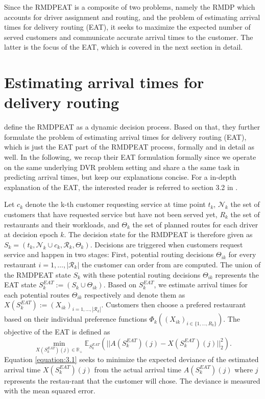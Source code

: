 Since the RMDPEAT is a composite of two problems, namely the RMDP which accounts for driver assignment and routing, and the problem of estimating arrival times for delivery routing (EAT), it seeks to maximize the expected number of served customers and communicate accurate arrival times to the customer. The latter is the focus of the EAT, which is covered in the next section in detail.

\section{Estimating arrival times for delivery routing}

\cite{Hildebrandt2020_EAT} define the RMDPEAT as a dynamic decision process. Based on that, they further formulate the problem of estimating arrival times for delivery routing (EAT), which is just the EAT part of the RMDPEAT process, formally and in detail as well. In the following, we recap their EAT formulation formally since we operate on the same underlying DVR problem setting and share a the same task in predicting arrival times, but keep our explanations concise. For a in-depth explanation of the EAT, the interested reader is referred to section 3.2 in \cite{Hildebrandt2020_EAT}. 

Let $ c_k $ denote the k-th customer requesting service at time point $ t_k $, $ \mathcal{N}_k $ the set of customers that have requested service but have not been served yet, $ R_k $ the set of restaurants and their workloads, and $ \Theta_k $ the set of planned routes for each driver at decision epoch $ k $. The decision state for the RMDPEAT is therefore given as $ S_k = (t_k, \mathcal{N}_k \cup c_k, \mathcal{R}_k, \Theta_k) $. Decisions are triggered when customers request service and happen in two stages: First, potential routing decisions $ \Theta_{ik} $ for every restaurant $ i = 1, \dots, |\mathcal{R}_k| $ the customer can order from are computed. The union of the RMDPEAT state $ S_k $ with these potential routing decisions $ \Theta_{ik} $ represents the EAT state $ S^{EAT}_k := (S_k \cup \Theta_{ik})$. Based on $ S^{EAT}_k $, we estimate arrival times for each potential routes $ \Theta_{ik} $ respectively and denote them as $ X(S^{EAT}_k) := (X_{ik})_{i = 1, \dots, |\mathcal{R}_k|}$. Customers then choose a prefered restaurant based on their individual preference functions $ \Phi_k((X_{ik})_{i \in \{1,\dots, R_k\}}) $.  
The objective of the EAT is defined as
\begin{equation}\label{equation:3.1}
	\min_{X(S^{EAT}_k)(j) \in \mathbb{R}_+} 
	\mathbb{E}_{S^{EAT}_{k}} 
	(|| A(S^{EAT}_{k})(j) - X(S^{EAT}_{k})(j)||^{2}_{2}).
\end{equation}
Equation \ref{equation:3.1} seeks to minimize the expected deviance of the estimated arrival time $ X(S^{EAT}_{k})(j) $ from the actual arrival time $ A(S^{EAT}_{k})(j) $ where $ j $ represents the restau-rant that the customer will chose. The deviance is measured with the mean squared error.


    